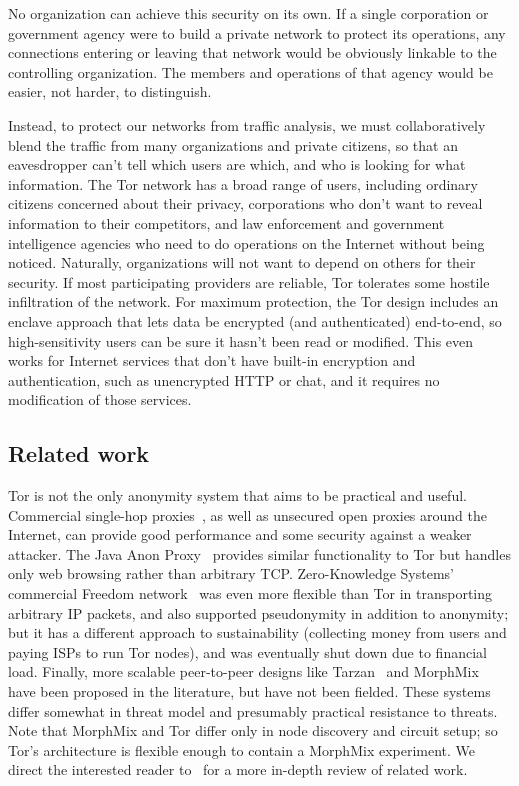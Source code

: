\documentclass{llncs}
\begin{document}
No organization can achieve this security on its own.  If a single
corporation or government agency were to build a private network to
protect its operations, any connections entering or leaving that network
would be obviously linkable to the controlling organization.  The members
and operations of that agency would be easier, not harder, to distinguish.

Instead, to protect our networks from traffic analysis, we must
collaboratively blend the traffic from many organizations and private
citizens, so that an eavesdropper can't tell which users are which,
and who is looking for what information.  %
The Tor network has a broad range of users, including ordinary citizens
concerned about their privacy, corporations
who don't want to reveal information to their competitors, and law
enforcement and government intelligence agencies who need
to do operations on the Internet without being noticed.
Naturally, organizations will not want to depend on others for their
security.  If most participating providers are reliable, Tor tolerates
some hostile infiltration of the network.  For maximum protection,
the Tor design includes an enclave approach that lets data be encrypted
(and authenticated) end-to-end, so high-sensitivity users can be sure it
hasn't been read or modified.  This even works for Internet services that
don't have built-in encryption and authentication, such as unencrypted
HTTP or chat, and it requires no modification of those services.

\subsection{Related work}
Tor is not the only anonymity system that aims to be practical and useful.
Commercial single-hop proxies~\cite{anonymizer}, as well as unsecured
open proxies around the Internet, can provide good
performance and some security against a weaker attacker. The Java
Anon Proxy~\cite{web-mix} provides similar functionality to Tor but
handles only web browsing rather than arbitrary TCP\@.
Zero-Knowledge Systems' commercial Freedom
network~\cite{freedom21-security} was even more flexible than Tor in
transporting arbitrary IP packets, and also supported
pseudonymity in addition to anonymity; but it has
a different approach to sustainability (collecting money from users
and paying ISPs to run Tor nodes), and was eventually shut down due to financial
load.  Finally,
more scalable peer-to-peer designs like Tarzan~\cite{tarzan:ccs02} and
MorphMix~\cite{morphmix:fc04} have been proposed in the literature, but
have not been fielded. These systems differ somewhat
in threat model and presumably practical resistance to threats.
Note that MorphMix and Tor differ only in
node discovery and circuit setup; so Tor's architecture is flexible
enough to contain a MorphMix experiment.
We direct the interested reader
to~\cite{tor-design} for a more in-depth review of related work.
\end{document}
